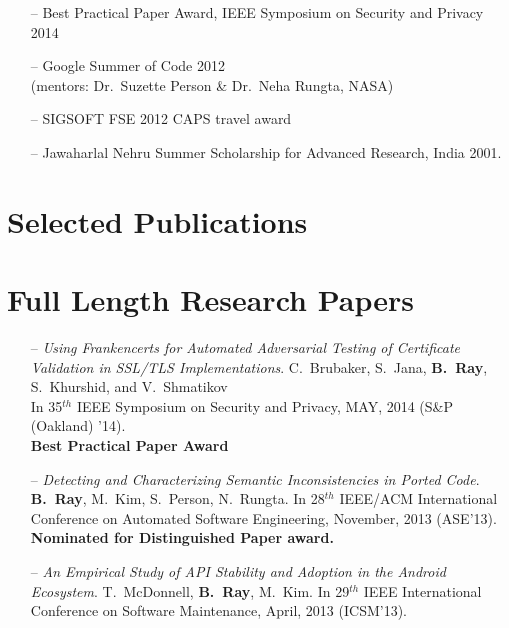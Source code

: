 \documentclass[overlapped,line,letterpaper, 12pt]{res}
\begin{document}
\begin{resume}
\begin{itemize}
\item[--]
Best Practical Paper Award, IEEE Symposium on Security and Privacy 2014
\item[--]
Google Summer of Code 2012\\ (mentors: Dr.~Suzette Person \& Dr.~Neha Rungta, NASA)
\item[--]
SIGSOFT FSE 2012 CAPS travel award 
\item[--]
Jawaharlal Nehru Summer Scholarship for Advanced Research, India 2001.
\end{itemize}

\section{Selected Publications}
\vspace{-0.1cm}
\section{\small Full Length Research Papers}

\begin{itemize}
\item[--]
{\em Using Frankencerts for Automated Adversarial Testing of Certificate Validation in SSL/TLS Implementations}. 
C.~Brubaker, S.~Jana, {\bf B.~Ray}, S.~Khurshid, and V.~Shmatikov \\
{\small In 35$^{th}$ IEEE Symposium on Security and Privacy, MAY, 2014 (S\&P (Oakland) '14).}\\
\textbf{\small Best Practical Paper Award}


\item[--]
{\em Detecting and Characterizing Semantic Inconsistencies in Ported Code}. 
{\bf B.~Ray}, M.~Kim, S.~Person, N.~Rungta.
{\small In 28$^{th}$ IEEE/ACM International Conference on Automated Software Engineering, 
November, 2013 (ASE'13).}
\textbf{\small Nominated for Distinguished Paper award.}


\item[--]
{\em An Empirical Study of API Stability and Adoption in the Android Ecosystem}. 
T.~McDonnell, {\bf B.~Ray},  M.~Kim. 
{\small In 29$^{th}$ IEEE International Conference on Software Maintenance, April, 2013 (ICSM'13).}


\end{itemize}
\end{resume}
\end{document}
